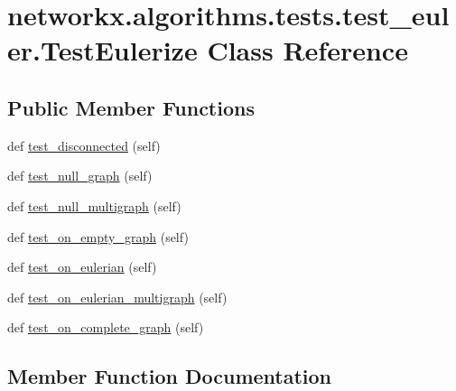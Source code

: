 \hypertarget{classnetworkx_1_1algorithms_1_1tests_1_1test__euler_1_1TestEulerize}{}\section{networkx.\+algorithms.\+tests.\+test\+\_\+euler.\+Test\+Eulerize Class Reference}
\label{classnetworkx_1_1algorithms_1_1tests_1_1test__euler_1_1TestEulerize}
\subsection*{Public Member Functions}
\begin{DoxyCompactItemize}
\item 
def \hyperlink{classnetworkx_1_1algorithms_1_1tests_1_1test__euler_1_1TestEulerize_a057450f1aa13848f41be73f937d9e6d7}{test\+\_\+disconnected} (self)
\item 
def \hyperlink{classnetworkx_1_1algorithms_1_1tests_1_1test__euler_1_1TestEulerize_ad76717522b7cfcaea07b3e3d529cc6d0}{test\+\_\+null\+\_\+graph} (self)
\item 
def \hyperlink{classnetworkx_1_1algorithms_1_1tests_1_1test__euler_1_1TestEulerize_aa98a877676817c386c0965020e8ef994}{test\+\_\+null\+\_\+multigraph} (self)
\item 
def \hyperlink{classnetworkx_1_1algorithms_1_1tests_1_1test__euler_1_1TestEulerize_a555e5558d96282bb1f38277475938aae}{test\+\_\+on\+\_\+empty\+\_\+graph} (self)
\item 
def \hyperlink{classnetworkx_1_1algorithms_1_1tests_1_1test__euler_1_1TestEulerize_a888db331b7e98c4e233f5a01bc41dc1a}{test\+\_\+on\+\_\+eulerian} (self)
\item 
def \hyperlink{classnetworkx_1_1algorithms_1_1tests_1_1test__euler_1_1TestEulerize_a3ed7153437302a7a31d773fd9561a53f}{test\+\_\+on\+\_\+eulerian\+\_\+multigraph} (self)
\item 
def \hyperlink{classnetworkx_1_1algorithms_1_1tests_1_1test__euler_1_1TestEulerize_a686eeafd789b69c25820d23bffad7f5f}{test\+\_\+on\+\_\+complete\+\_\+graph} (self)
\end{DoxyCompactItemize}


\subsection{Member Function Documentation}
\mbox{\label{classnetworkx_1_1algorithms_1_1tests_1_1test__euler_1_1TestEulerize_a057450f1aa13848f41be73f937d9e6d7}} 
